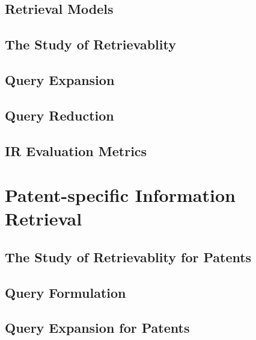 \subsection{Retrieval Models}
\label{subsub:retmodels}


\subsection{The Study of Retrievablity}

\label{subsub:retrievability}

\subsection{Query Expansion}


\subsection{Query Reduction}

%

\subsection{IR Evaluation Metrics}



\section{Patent-specific Information Retrieval}
\label{subsec:patentir}

\subsection{The Study of Retrievablity for Patents}


\subsection{Query Formulation}


\subsection{Query Expansion for Patents}


